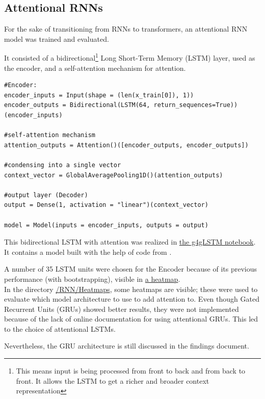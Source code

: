\documentclass{article}
\begin{document}
\subsection{Attentional RNNs}
For the sake of transitioning from RNNs to transformers, an attentional RNN model was trained and evaluated.

It consisted of a bidirectional\footnote{This means input is being processed from front to back and from back to front. It allows the LSTM to get a richer and broader context representation} Long Short-Term Memory (LSTM) layer, used as the encoder, and a self-attention mechanism for attention.

\begin{Verbatim}
#Encoder:
encoder_inputs = Input(shape = (len(x_train[0]), 1))
encoder_outputs = Bidirectional(LSTM(64, return_sequences=True))(encoder_inputs)

#self-attention mechanism
attention_outputs = Attention()([encoder_outputs, encoder_outputs])

#condensing into a single vector
context_vector = GlobalAveragePooling1D()(attention_outputs)

#output layer (Decoder)
output = Dense(1, activation = "linear")(context_vector)

model = Model(inputs = encoder_inputs, outputs = output)
\end{Verbatim}

This bidirectional LSTM with attention was realized in \href{https://github.com/AntonStantan/matura/blob/main/attentional-RNN/g4gLSTM.ipynb}{the g4gLSTM notebook}. It contains a model built with the help of code from \cite{geeksforgeeks_attention_bilstm}.

A number of 35 LSTM units were chosen for the Encoder because of its previous performance (with bootstrapping), visible in \href{https://github.com/AntonStantan/matura/blob/main/attentional-RNN/previousHeatmap.png}{a heatmap}.
\\[2em]
In the directory \href{https://github.com/AntonStantan/matura/tree/main/RNN/Heatmaps}{/RNN/Heatmaps}, some heatmaps are visible; these were used to evaluate which model architecture to use to add attention to. Even though Gated Recurrent Units (GRUs) showed better results, they were not implemented because of the lack of online documentation for using attentional GRUs. This led to the choice of attentional LSTMs.

Nevertheless, the GRU architecture is still discussed in the findings document.
\end{document}
